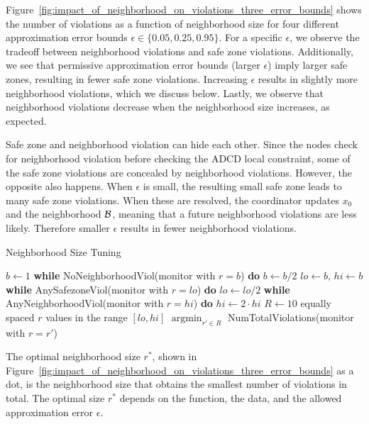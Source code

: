 Figure~\ref{fig:impact_of_neighborhood_on_violations_three_error_bounds} shows the number of violations as a function of neighborhood size for four different approximation error bounds $\epsilon \in \{0.05, 0.25, 0.95\}$.
For a specific $\epsilon$, we observe the tradeoff
between neighborhood violations and safe zone violations.
Additionally, we see that permissive approximation error bounds (larger $\epsilon$) imply larger safe zones, resulting in fewer safe zone violations.
Increasing $\epsilon$ results in slightly more neighborhood violations, which we discuss below.
Lastly, we observe that neighborhood violations decrease when the neighborhood size increases, as expected.



Safe zone and neighborhood violation can hide each other.
Since the nodes check for neighborhood violation before checking the ADCD local constraint, some of the safe zone violations are concealed by neighborhood violations.
However, the opposite also happens.
When $\epsilon$ is small, the resulting small safe zone leads to many safe zone violations. 
When these are resolved, the coordinator updates $x_0$ and the neighborhood $\mathcal{B}$, meaning that a future neighborhood violations are less likely. 
Therefore smaller $\epsilon$ results in fewer neighborhood violations.

\begin{algorithm}[t]
	\caption{Neighborhood Size Tuning}
	\begin{algorithmic}
		\State $b \gets 1$
		\State \textbf{while} NoNeighborhoodViol(monitor with $r=b$) \textbf{do} $b \gets b / 2$
		\State $lo \gets b$, $hi \gets b$
		\State \textbf{while} AnySafezoneViol(monitor with $r=lo$) \textbf{do} $lo \gets lo / 2$
		\State \textbf{while} AnyNeighborhoodViol(monitor with $r=hi$) \textbf{do} $hi \gets 2\cdot hi$
		\State $R \gets 10$ equally spaced $r$ values in the range $[lo, hi]$
		\Return $\operatorname{argmin}_{r' \in R}$ NumTotalViolations(monitor with $r=r'$)
	\end{algorithmic}
	\label{algo:sub_domain_tuning}
\end{algorithm}



The optimal neighborhood size $r^*$, shown in Figure~\ref{fig:impact_of_neighborhood_on_violations_three_error_bounds} as a dot, is the neighborhood size that obtains the smallest number of violations in total.
The optimal size $r^*$ depends on the function, the data, and the allowed approximation error $\epsilon$.

